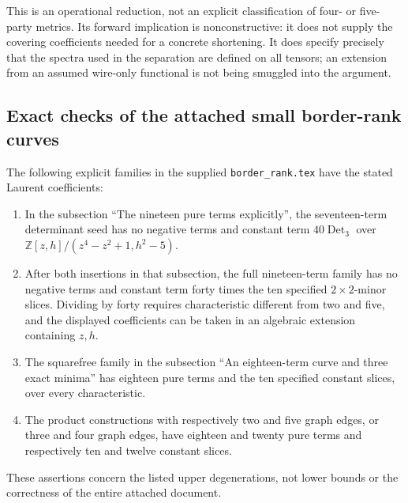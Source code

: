 This is an operational reduction, not an explicit classification of
four- or five-party metrics. Its forward implication is nonconstructive:
it does not supply the covering coefficients needed for a concrete
shortening. It does specify precisely that the spectra used in the
separation are defined on all tensors; an extension from an assumed
wire-only functional is not being smuggled into the argument.

\subsection{Exact checks of the attached small border-rank curves}

\begin{proposition}
\label{rt:border}
The following explicit families in the supplied \texttt{border\_rank.tex}
have the stated Laurent coefficients:
\begin{enumerate}
\item In the subsection ``The nineteen pure terms explicitly'',
the seventeen-term determinant seed has no negative terms and constant
term $40\operatorname{Det}_3$ over
$\mathbb Z[z,h]/(z^4-z^2+1,h^2-5)$.
\item After both insertions in that subsection, the full nineteen-term
family has no negative terms and constant term forty times the ten
specified $2\times2$-minor slices. Dividing by forty requires
characteristic different from two and five, and the displayed
coefficients can be taken in an algebraic extension containing $z,h$.
\item The squarefree family in the subsection ``An eighteen-term curve
and three exact minima'' has eighteen pure terms and the ten specified
constant slices, over every characteristic.
\item The product constructions with respectively two and five graph
edges, or three and four graph edges, have eighteen and twenty pure
terms and respectively ten and twelve constant slices.
\end{enumerate}
These assertions concern the listed upper degenerations, not lower
bounds or the correctness of the entire attached document.
\end{proposition}
